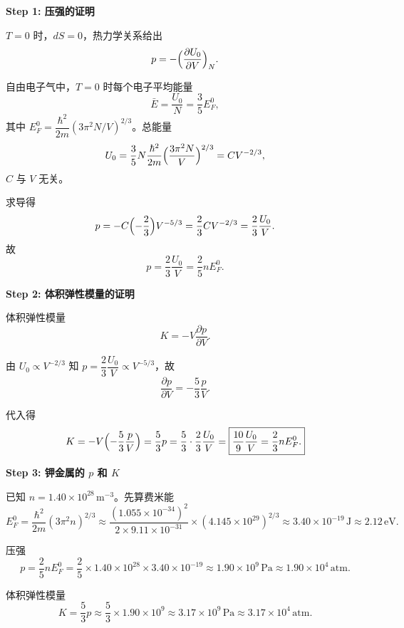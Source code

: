 \begin{derivationbox}[标准解题过程]
\textbf{Step 1: 压强的证明}

$T=0$ 时，$dS=0$，热力学关系给出
\begin{equation}
p=-\Bigl(\frac{\partial U_0}{\partial V}\Bigr)_N.
\end{equation}

自由电子气中，$T=0$ 时每个电子平均能量
\begin{equation}
\bar E=\frac{U_0}{N}=\frac{3}{5}E_F^0,
\end{equation}
其中 $E_F^0=\dfrac{\hbar^2}{2m}(3\pi^2N/V)^{2/3}$。总能量
\begin{equation}
U_0=\frac{3}{5}N\frac{\hbar^2}{2m}\Bigl(\frac{3\pi^2N}{V}\Bigr)^{2/3}=CV^{-2/3},
\end{equation}
$C$ 与 $V$ 无关。

求导得
\begin{equation}
p=-C\Bigl(-\frac{2}{3}\Bigr)V^{-5/3}=\frac{2}{3}CV^{-2/3}
=\frac{2}{3}\frac{U_0}{V}.
\end{equation}
故
\begin{equation}
\boxed{p=\frac{2}{3}\frac{U_0}{V}=\frac{2}{5}nE_F^0.}
\end{equation}

\textbf{Step 2: 体积弹性模量的证明}

体积弹性模量
\begin{equation}
K=-V\frac{\partial p}{\partial V}.
\end{equation}

由 $U_0\propto V^{-2/3}$ 知 $p=\dfrac{2}{3}\dfrac{U_0}{V}\propto V^{-5/3}$，故
\begin{equation}
\frac{\partial p}{\partial V}=-\frac{5}{3}\frac{p}{V}.
\end{equation}

代入得
\begin{equation}
K=-V\Bigl(-\frac{5}{3}\frac{p}{V}\Bigr)=\frac{5}{3}p
=\frac{5}{3}\cdot\frac{2}{3}\frac{U_0}{V}
=\boxed{\frac{10}{9}\frac{U_0}{V}=\frac{2}{3}nE_F^0.}
\end{equation}

\textbf{Step 3: 钾金属的 $p$ 和 $K$}

已知 $n=1.40\times10^{28}\,\text{m}^{-3}$。先算费米能
\begin{equation}
E_F^0=\frac{\hbar^2}{2m}(3\pi^2n)^{2/3}
\approx\frac{(1.055\times10^{-34})^2}{2\times9.11\times10^{-31}}\times(4.145\times10^{29})^{2/3}
\approx3.40\times10^{-19}\,\text{J}\approx2.12\,\text{eV}.
\end{equation}

压强
\begin{equation}
\boxed{p=\frac{2}{5}nE_F^0=\frac{2}{5}\times1.40\times10^{28}\times3.40\times10^{-19}
\approx1.90\times10^9\,\text{Pa}\approx1.90\times10^4\,\text{atm}.}
\end{equation}

体积弹性模量
\begin{equation}
\boxed{K=\frac{5}{3}p\approx\frac{5}{3}\times1.90\times10^9
\approx3.17\times10^9\,\text{Pa}\approx3.17\times10^4\,\text{atm}.}
\end{equation}
\end{derivationbox}

